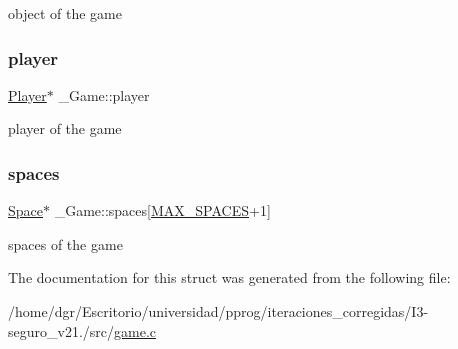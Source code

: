 object of the game \mbox{\label{struct__Game_a31406605782d71ec00c4bf258ea76267}} 
\subsubsection{\texorpdfstring{player}{player}}
{\footnotesize\ttfamily \hyperlink{player_8h_af30e2030635a69690f85e48bc6ef202f}{Player}$\ast$ \+\_\+\+Game\+::player}

player of the game \mbox{\label{struct__Game_ab4180417d9148f8abb2233ca6c4ecfe5}} 
\subsubsection{\texorpdfstring{spaces}{spaces}}
{\footnotesize\ttfamily \hyperlink{space_8h_a67533ffc2b70463baecc38fb0629bbfc}{Space}$\ast$ \+\_\+\+Game\+::spaces\mbox{[}\hyperlink{space_8h_a5f54fd55f983a2e33ce076cd9f587e82}{M\+A\+X\+\_\+\+S\+P\+A\+C\+ES}+1\mbox{]}}

spaces of the game 

The documentation for this struct was generated from the following file\+:\begin{DoxyCompactItemize}
\item 
/home/dgr/\+Escritorio/universidad/pprog/iteraciones\+\_\+corregidas/\+I3-\/seguro\+\_\+v21./src/\hyperlink{game_8c}{game.\+c}\end{DoxyCompactItemize}
